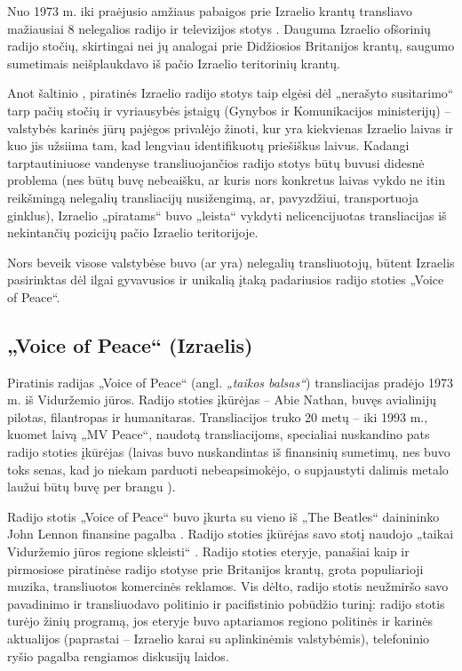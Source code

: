 \documentclass[kursinis-darbas]{vukf}
\begin{document}
Nuo 1973 m. iki praėjusio amžiaus pabaigos prie Izraelio krantų transliavo mažiausiai 8 nelegalios radijo ir televizijos stotys \cite{soundscapes_the_worlds_last_offshore_radio_stations}. Dauguma Izraelio ofšorinių radijo stočių, skirtingai nei jų analogai prie Didžiosios Britanijos krantų, saugumo sumetimais neišplaukdavo iš pačio Izraelio teritorinių krantų.

Anot šaltinio \cite{offshore_radio_israel}, piratinės Izraelio radijo stotys taip elgėsi dėl „nerašyto susitarimo“ tarp pačių stočių ir vyriausybės įstaigų (Gynybos ir Komunikacijos ministerijų) – valstybės karinės jūrų pajėgos privalėjo žinoti, kur yra kiekvienas Izraelio laivas ir kuo jis užsiima tam, kad lengviau identifikuotų priešiškus laivus. Kadangi tarptautiniuose vandenyse transliuojančios radijo stotys būtų buvusi didesnė problema (nes būtų buvę nebeaišku, ar kuris nors konkretus laivas vykdo ne itin reikšmingą nelegalių transliacijų nusižengimą, ar, pavyzdžiui, transportuoja ginklus), Izraelio „piratams“ buvo „leista“ vykdyti nelicencijuotas transliacijas iš nekintančių pozicijų pačio Izraelio teritorijoje.

Nors beveik visose valstybėse buvo (ar yra) nelegalių transliuotojų, būtent Izraelis pasirinktas dėl ilgai gyvavusios ir unikalią įtaką padariusios radijo stoties „Voice of Peace“.

\subsection{„Voice of Peace“ (Izraelis)}

Piratinis radijas „Voice of Peace“ (angl. \emph{„taikos balsas“}) transliacijas pradėjo 1973 m. iš Viduržemio jūros. Radijo stoties įkūrėjas – Abie Nathan, buvęs avialinijų pilotas, filantropas ir humanitaras. Transliacijos truko 20 metų – iki 1993 m., kuomet laivą „MV Peace“, naudotą transliacijoms, specialiai nuskandino pats radijo stoties įkūrėjas \cite{soundscapes_voice_of_peace} (laivas buvo nuskandintas iš finansinių sumetimų, nes buvo toks senas, kad jo niekam parduoti nebeapsimokėjo, o supjaustyti dalimis metalo laužui būtų buvę per brangu \cite{soundscapes_the_worlds_last_offshore_radio_stations}).

Radijo stotis „Voice of Peace“ buvo įkurta su vieno iš „The Beatles“ dainininko John Lennon finansine pagalba \cite{soundscapes_talking_peace_in_new_york}. Radijo stoties įkūrėjas savo stotį naudojo „taikai Viduržemio jūros regione skleisti“ \cite{soundscapes_abie_nathans_peace_programme}. Radijo stoties eteryje, panašiai kaip ir pirmosiose piratinėse radijo stotyse prie Britanijos krantų, grota populiarioji muzika, transliuotos komercinės reklamos. Vis dėlto, radijo stotis neužmiršo savo pavadinimo ir transliuodavo politinio ir pacifistinio pobūdžio turinį: radijo stotis turėjo žinių programą, jos eteryje buvo aptariamos regiono politinės ir karinės aktualijos (paprastai – Izraelio karai su aplinkinėmis valstybėmis), telefoninio ryšio pagalba rengiamos diskusijų laidos.
\end{document}
